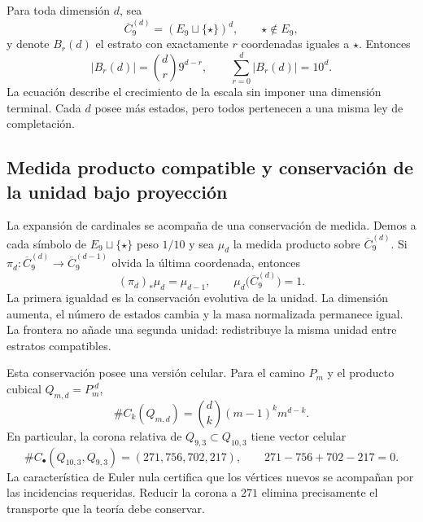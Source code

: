 Para toda dimensión \(d\), sea
\begin{equation}\label{p12-83-c0-s2:eq:amp-completacion-d}
 \overline C_9^{(d)}=(E_9\sqcup\{\star\})^d,
 \qquad \star\notin E_9,
\end{equation}
y denote \(B_r(d)\) el estrato con exactamente \(r\) coordenadas iguales a
\(\star\). Entonces
\begin{equation}\label{p12-83-c0-s2:eq:amp-estratos-binomial}
 |B_r(d)|=\binom dr9^{d-r},
 \qquad
 \sum_{r=0}^{d}|B_r(d)|=10^d.
\end{equation}
La ecuación describe el crecimiento de la escala sin imponer una dimensión
terminal. Cada \(d\) posee más estados, pero todos pertenecen a una misma ley
de completación.

\subsection{Medida producto compatible y conservación de la unidad bajo proyección}

La expansión de cardinales se acompaña de una conservación de medida. Demos
a cada símbolo de \(E_9\sqcup\{\star\}\) peso \(1/10\) y sea \(\mu_d\) la
medida producto sobre \(\overline C_9^{(d)}\). Si
\(\pi_d:\overline C_9^{(d)}\to\overline C_9^{(d-1)}\) olvida la última
coordenada, entonces
\begin{equation}\label{p12-83-c0-s2:eq:amp-conservacion-proyectiva}
 (\pi_d)_*\mu_d=\mu_{d-1},
 \qquad
 \mu_d\bigl(\overline C_9^{(d)}\bigr)=1.
\end{equation}
La primera igualdad es la conservación evolutiva de la unidad. La dimensión
aumenta, el número de estados cambia y la masa normalizada permanece igual.
La frontera no añade una segunda unidad: redistribuye la misma unidad entre
estratos compatibles.

Esta conservación posee una versión celular. Para el camino \(P_m\) y el
producto cubical \(Q_{m,d}=P_m^{\square d}\),
\begin{equation}\label{p12-83-c0-s2:eq:amp-celdas-cubicales}
 \#C_k(Q_{m,d})=\binom dk(m-1)^k m^{d-k}.
\end{equation}
En particular, la corona relativa de \(Q_{9,3}\subset Q_{10,3}\) tiene
vector celular
\begin{equation}\label{p12-83-c0-s2:eq:amp-corona-completa}
 \#C_\bullet(Q_{10,3},Q_{9,3})=(271,756,702,217),
 \qquad 271-756+702-217=0.
\end{equation}
La característica de Euler nula certifica que los vértices nuevos se
acompañan por las incidencias requeridas. Reducir la corona a \(271\) elimina
precisamente el transporte que la teoría debe conservar.

